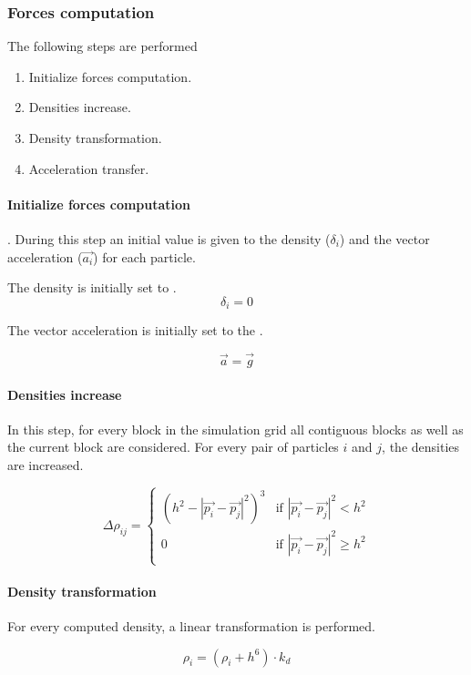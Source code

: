 \subsubsection{Forces computation}

The following steps are performed

\begin{enumerate}
\item Initialize forces computation.
\item Densities increase.
\item Density transformation.
\item Acceleration transfer.
\end{enumerate}

\paragraph{Initialize forces computation}.
During this step an initial value is given to the density ($\delta_i$) and the
vector acceleration ($\vec{a_i}$) for each particle.

The density is initially set to .
\[
\delta_i = 0
\]

The vector acceleration is initially set to the .

\[
\vec{a} = \vec{g}
\]

\paragraph{Densities increase}
In this step, for every block in the simulation grid all contiguous blocks as
well as the current block are considered. For every pair of particles $i$ and
$j$, the densities are increased.

\[
\Delta \rho_{ij} = 
    \begin{cases}
      (h^2 - |\vec{p_i} - \vec{p_j}|^2)^3 & 
          \text{if  } |\vec{p_i} - \vec{p_j}|^2 < h^2\\
      0 & 
          \text{if  } |\vec{p_i} - \vec{p_j}|^2 \geq h^2\\
    \end{cases}
\]

\paragraph{Density transformation}
For every computed density, a linear transformation is performed.

\[
\rho_i = (\rho_i + h^6) \cdot k_d
\]

